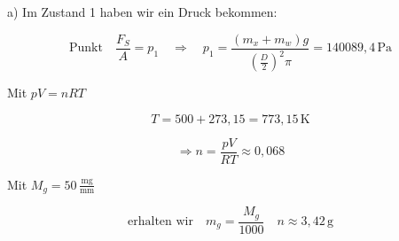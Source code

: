 a) Im Zustand 1 haben wir ein Druck bekommen:

\[
\text{Punkt} \quad \frac{F_S}{A} = p_1 \quad \Rightarrow \quad p_1 = \frac{(m_x + m_w)g}{\left(\frac{D}{2}\right)^2 \pi} = \boxed{140089,4 \, \text{Pa}}
\]

Mit \quad \( pV = nRT \)

\[
T = 500 + 273,15 = 773,15 \, \text{K}
\]

\[
\Rightarrow n = \frac{pV}{RT} \approx 0,068
\]

Mit \quad \( M_g = 50 \, \frac{\text{mg}}{\text{mm}} \)

\[
\text{erhalten wir} \quad m_g = \frac{M_g}{1000} \quad n \approx 3,42 \, \text{g}
\]